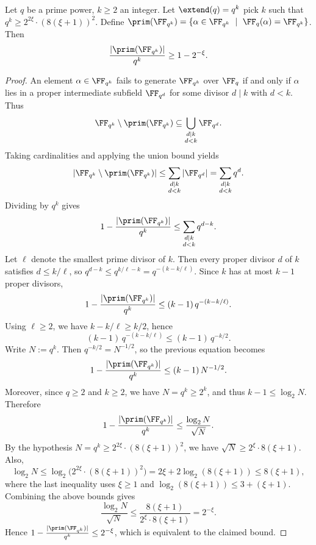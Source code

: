 \begin{lemma}
\label{lemma:app-primitive-element-sampling}
Let $q$ be a prime power, $k\ge 2$ an integer. Let $\extend(q) = q^k$ pick $k$ such that $q^k \geq 2^{2\xi} \cdot (8(\xi+1))^2$. Define $\prim(\FF_{q^k}) = \{\alpha\in \FF_{q^k} \ \mid \ \FF_q(\alpha)=\FF_{q^k}\}$. Then
\[
\frac{|\prim(\FF_{q^k})|}{q^k} \ge 1-2^{-\xi}.
\]
\end{lemma}
\begin{proof}
An element $\alpha\in \FF_{q^k}$ fails to generate $\FF_{q^k}$ over $\FF_q$ if and only if
$\alpha$ lies in a proper intermediate subfield $\FF_{q^d}$ for some divisor $d\mid k$ with $d<k$.
Thus
\[
\FF_{q^k}\setminus \prim(\FF_{q^k}) \subseteq \bigcup_{\substack{d\mid k\\ d<k}} \FF_{q^d}.
\]
Taking cardinalities and applying the union bound yields
\[
|\FF_{q^k}\setminus \prim(\FF_{q^k})|
\le \sum_{\substack{d\mid k\\ d<k}} |\FF_{q^d}|
= \sum_{\substack{d\mid k\\ d<k}} q^d.
\]
Dividing by $q^k$ gives
\[
1-\frac{|\prim(\FF_{q^k})|}{q^k}
\le \sum_{\substack{d\mid k\\ d<k}} q^{d-k}.
\]
Let $\ell$ denote the smallest prime divisor of $k$. Then every proper divisor $d$ of $k$ satisfies
$d\le k/\ell$, so $q^{d-k}\le q^{k/\ell-k}=q^{-(k-k/\ell)}$. Since $k$ has at most $k-1$ proper divisors,
\[
1-\frac{|\prim(\FF_{q^k})|}{q^k}
\le (k-1)\,q^{-(k-k/\ell)}.
\]
Using $\ell\ge 2$, we have $k-k/\ell \ge k/2$, hence
\[
(k-1)\,q^{-(k-k/\ell)} \le (k-1)\,q^{-k/2}.
\]
Write $N := q^k$. Then $q^{-k/2}=N^{-1/2}$, so the previous equation becomes
\[
1-\frac{|\prim(\FF_{q^k})|}{q^k}
\le (k-1)\,N^{-1/2}.
\]
Moreover, since $q\ge 2$ and $k\ge 2$, we have $N=q^k\ge 2^k$, and thus $k-1\le \log_2 N$.
Therefore
\[
1-\frac{|\prim(\FF_{q^k})|}{q^k}
\le \frac{\log_2 N}{\sqrt{N}}.
\]
By the hypothesis $N=q^k \ge 2^{2\xi}\cdot (8(\xi+1))^2$, we have
$\sqrt{N}\ge 2^\xi\cdot 8(\xi+1)$. Also,
\[
\log_2 N
\le \log_2\!\Big(2^{2\xi}\cdot (8(\xi+1))^2\Big)
= 2\xi + 2\log_2(8(\xi+1))
\le 8(\xi+1),
\]
where the last inequality uses $\xi\ge 1$ and $\log_2(8(\xi+1))\le 3+(\xi+1)$.
Combining the above bounds gives
\[
\frac{\log_2 N}{\sqrt{N}}
\le \frac{8(\xi+1)}{2^\xi\cdot 8(\xi+1)}
= 2^{-\xi}.
\]
Hence $1-\frac{|\prim(\FF_{q^k})|}{q^k}\le 2^{-\xi}$, which is equivalent to the claimed bound.
\end{proof}